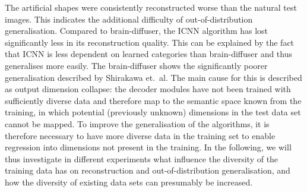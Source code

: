 The artificial shapes were consistently  reconstructed worse than the natural test images. This indicates the additional difficulty of out-of-distribution generalisation. Compared to brain-diffuser, the ICNN algorithm has lost significantly less in its reconstruction quality. This can be explained by the fact that ICNN is less dependent on learned categories than brain-diffuser and thus generalises more easily. The brain-diffuser shows the significantly poorer generalisation described by Shirakawa et.\ al.\cite{shirakawaSpuriousReconstructionBrain2024} The main cause for this is described as output dimension collapse: the decoder modules have not been trained with sufficiently diverse data and therefore map to the semantic space known from the training, in which potential (previously unknown) dimensions in the test data set cannot be mapped. To improve the generalisation of the algorithms, it is therefore necessary to have more diverse data in the training set to enable regression into dimensions not present in the training. In the following, we will thus investigate in different experiments what influence the diversity of the training data has on reconstruction and out-of-distribution generalisation, and how the diversity of existing data sets can presumably be increased. 